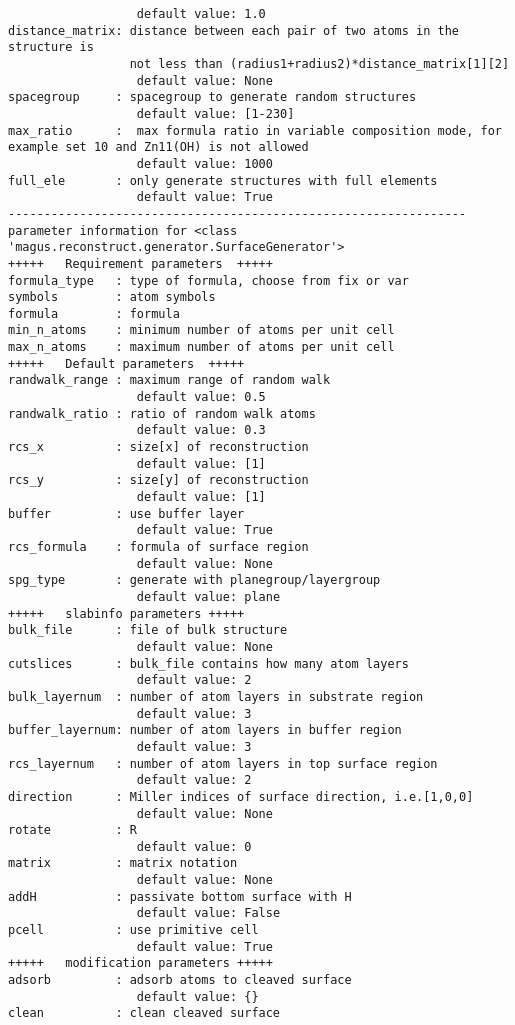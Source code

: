 \documentclass[12pt,oneside]{book}
\begin{document}
\begin{tcolorbox}
\begin{verbatim}
                  default value: 1.0
distance_matrix: distance between each pair of two atoms in the structure is
                 not less than (radius1+radius2)*distance_matrix[1][2]
                  default value: None
spacegroup     : spacegroup to generate random structures
                  default value: [1-230]
max_ratio      :  max formula ratio in variable composition mode, for example set 10 and Zn11(OH) is not allowed
                  default value: 1000
full_ele       : only generate structures with full elements
                  default value: True
----------------------------------------------------------------
parameter information for <class 'magus.reconstruct.generator.SurfaceGenerator'>
+++++	Requirement parameters	+++++
formula_type   : type of formula, choose from fix or var
symbols        : atom symbols
formula        : formula
min_n_atoms    : minimum number of atoms per unit cell
max_n_atoms    : maximum number of atoms per unit cell
+++++	Default parameters	+++++
randwalk_range : maximum range of random walk
                  default value: 0.5
randwalk_ratio : ratio of random walk atoms
                  default value: 0.3
rcs_x          : size[x] of reconstruction
                  default value: [1]
rcs_y          : size[y] of reconstruction
                  default value: [1]
buffer         : use buffer layer
                  default value: True
rcs_formula    : formula of surface region
                  default value: None
spg_type       : generate with planegroup/layergroup
                  default value: plane
+++++	slabinfo parameters	+++++
bulk_file      : file of bulk structure
                  default value: None
cutslices      : bulk_file contains how many atom layers
                  default value: 2
bulk_layernum  : number of atom layers in substrate region
                  default value: 3
buffer_layernum: number of atom layers in buffer region
                  default value: 3
rcs_layernum   : number of atom layers in top surface region
                  default value: 2
direction      : Miller indices of surface direction, i.e.[1,0,0]
                  default value: None
rotate         : R
                  default value: 0
matrix         : matrix notation
                  default value: None
addH           : passivate bottom surface with H
                  default value: False
pcell          : use primitive cell
                  default value: True
+++++	modification parameters	+++++
adsorb         : adsorb atoms to cleaved surface
                  default value: {}
clean          : clean cleaved surface

\end{verbatim}
\end{tcolorbox}
\end{document}
